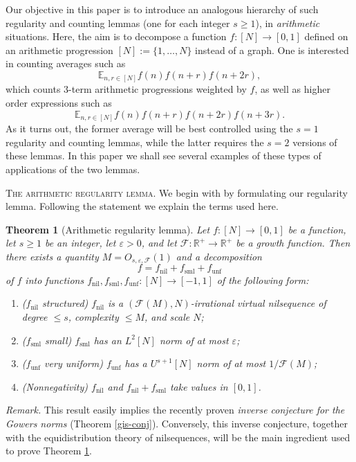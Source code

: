 \documentclass[11pt,reqno]{amsart}
\numberwithin{equation}{section}
\theoremstyle{plain}
\newtheorem{theorem}[subsection]{Theorem}
\theoremstyle{definition}
\renewcommand{\leq}{\leqslant}
\renewcommand{\geq}{\geqslant}
\newcommand\E{{\mathbb{E}}}
\newcommand\R{\mathbb{R}}
\newcommand\1{{\bf 1}}
\newcommand\2{{\bf 2}}
\newcommand\eps{\varepsilon}
\newcommand\nil{{\operatorname{nil}}}
\newcommand\sml{{\operatorname{sml}}}
\newcommand\unf{{\operatorname{unf}}}
\newcommand\Grow{{\mathcal F}}
\begin{document}
Our objective in this paper is to introduce an analogous hierarchy of such regularity and counting lemmas (one for each integer $s \geq 1$), in \emph{arithmetic} situations. Here, the aim is to decompose a function $f: [N] \to [0,1]$ defined on an arithmetic progression $[N] := \{1,\ldots,N\}$ instead of a graph. One is interested in counting averages such as
$$
\E_{n,r \in [N]} f(n) f(n+r) f(n+2r),
$$
which counts $3$-term arithmetic progressions weighted by $f$, as well as higher order expressions such as
$$
\E_{n,r \in [N]} f(n) f(n+r) f(n+2r) f(n+3r).
$$
As it turns out, the former average will be best controlled using the $s=1$ regularity and counting lemmas, while the latter requires the $s=2$ versions of these lemmas.  In this paper we shall see several examples of these types of applications of the two lemmas.\vspace{11pt}

\textsc{The arithmetic regularity lemma.} We begin with by formulating our regularity lemma. Following the statement we explain the terms used here.

\begin{theorem}[Arithmetic regularity lemma]\label{strong-reg}
Let $f: [N] \to [0,1]$ be a function, let $s \geq 1$ be an integer, let $\eps > 0$, and let $\Grow: \R^+ \to \R^+$ be a growth function.  Then there exists a quantity $M = O_{s,\eps,\Grow}(1)$ and a decomposition 
$$ f = f_{\nil} + f_{\sml} + f_{\unf}$$
of $f$ into functions $f_\nil, f_\sml, f_\unf: [N] \to [-1,1]$ of the following form:
\begin{enumerate}
\item \textup{(}$f_\nil$ structured\textup{)} $f_\nil$ is a $(\Grow(M),N)$-irrational virtual nilsequence of degree $\leq s$, complexity $\leq M$, and scale $N$;
\item \textup{(}$f_\sml$ small\textup{)} $f_\sml$ has an $L^2[N]$ norm of at most $\eps$;
\item \textup{(}$f_\unf$ very uniform\textup{)} $f_\unf$ has a $U^{s+1}[N]$ norm of at most $1/\Grow(M)$;
\item \textup{(}Nonnegativity\textup{)} $f_{\nil}$ and $f_\nil + f_\sml$ take values in $[0,1]$.
\end{enumerate}
\end{theorem}

\emph{Remark.} This result easily implies the recently proven \emph{inverse conjecture for the Gowers norms} (Theorem \ref{gis-conj}).  Conversely, this inverse conjecture, together with the equidistribution theory of nilsequences, will be the main ingredient used to prove Theorem \ref{strong-reg}.
\end{document}
